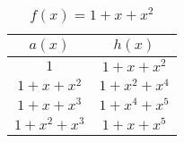 \begin{table}[htbp]
 \caption{$f(x)=1+x+x^2$}
\centering
 \begin{tabular}{c c} 
 \hline
 $a(x)$ & $h(x)$\\ [0.5ex] 
 \hline\hline
$1$ & $1+x+x^2$\\ 
\hline
$1+x+x^2$ &  $1+x^2+x^4$\\
\hline
$1+x+x^3$ & $1+x^4+x^5$\\
\hline
$1+x^2+x^3$ & $1+x+x^5$ 
 \end{tabular}
 \label{novelTab8}
\end{table}





